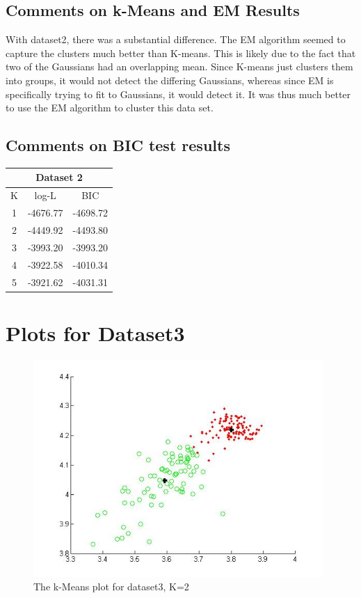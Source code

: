 \documentclass[11pt,psfig]{article}
\begin{document}
\subsection{Comments on k-Means and EM Results}

With dataset2, there was a substantial difference. The EM algorithm seemed to capture the clusters much better than K-means. This is likely due to the fact that two of the Gaussians had an overlapping mean. Since K-means just clusters them into groups, it would not detect the differing Gaussians, whereas since EM is specifically trying to fit to Gaussians, it would detect it. It was thus much better to use the EM algorithm to cluster this data set. 

\subsection{Comments on BIC test results}

\begin{table}[H]
  \centering
  \begin{tabular}{|c|c|c|}
    \hline
    \multicolumn{3}{|c|}{Dataset 2} \\\hline
    K & log-L & BIC \\\hline
    1 & -4676.77 & -4698.72 \\
		2 & -4449.92 & -4493.80 \\
		3 & -3993.20 & -3993.20 \\
		4 & -3922.58 & -4010.34 \\
    5 & -3921.62 & -4031.31 \\\hline
  \end{tabular}
\end{table}

\section{Plots for Dataset3}

\begin{figure}[H]
\centering
\includegraphics[height=3.25in]{dataset3_kMeansPlot.jpg}
\caption{The k-Means plot for dataset3, K=2}
\end{figure}
\end{document}
